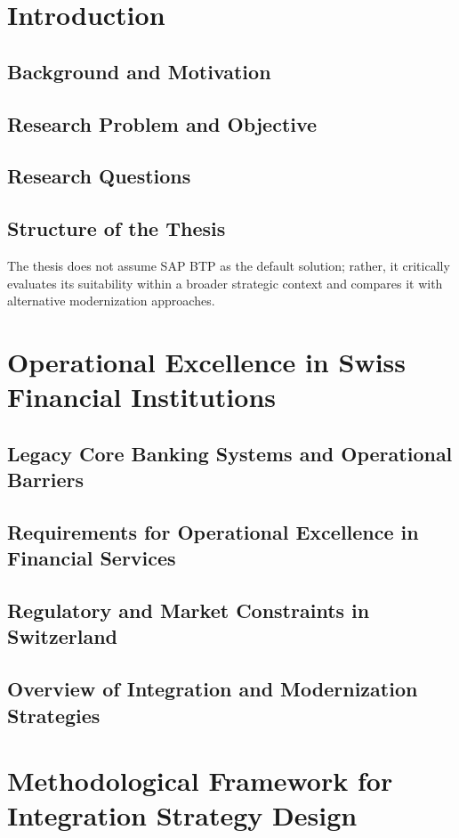 \section{Introduction}
\subsection*{Background and Motivation}
\subsection*{Research Problem and Objective}
\subsection*{Research Questions}
\subsection*{Structure of the Thesis}
The thesis does not assume SAP BTP as the default solution; rather, it critically evaluates its suitability within a broader strategic context and compares it with alternative modernization approaches.
\newpage

\section{Operational Excellence in Swiss Financial Institutions}
\subsection{Legacy Core Banking Systems and Operational Barriers}
\subsection{Requirements for Operational Excellence in Financial Services}
\subsection{Regulatory and Market Constraints in Switzerland}
\subsection{Overview of Integration and Modernization Strategies}
\newpage

\section{Methodological Framework for Integration Strategy Design}
